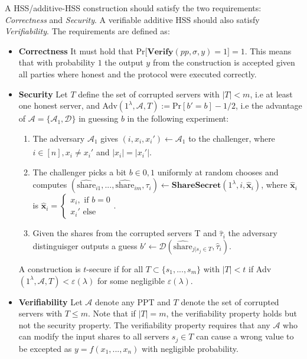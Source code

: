 A HSS/additive-HSS construction should satisfy the two requirements: \textit{Correctness} and \textit{Security}. A verifiable additive HSS should also satisfy \textit{Verifiability}. The requirements are defined as:
\begin{itemize}
    \item \textbf{Correctness} It must hold that Pr$\Big[\textbf{Verify}(pp,\sigma,y)=1\Big]=1$. This means that with probability $1$ the output $y$ from the construction is accepted given all parties where honest and the protocol were executed correctly.
    \item \textbf{Security} Let $T$ define the set of corrupted servers with $|T|<m$, i.e at least one honest server, and Adv$(1^\lambda,\mathcal{A},T):= \text{Pr}[b' = b]-1/2$, i.e the advantage of $\mathcal{A}=\{\mathcal{A}_1,\mathcal{D}\}$ in guessing $b$ in the following experiment:
    \begin{enumerate}
        \item The adversary $\mathcal{A}_1$ gives $(i,x_i,x_i')\xleftarrow[]{}\mathcal{A}_1$ to the challenger, where $i\in[n], x_i\neq x_i'$ and $|x_i|=|x_i'|$.
        \item The challenger picks a bit $b\in{0,1}$ uniformly at random chooses and computes $(\hat{\text{share}}_{i1},...,\hat{\text{share}}_{im},\tau_i)\xleftarrow[]{}\textbf{ShareSecret}(1^\lambda,i,\hat{\mathbf{x}}_i)$, where $\hat{\textbf{x}}_i$ is $\hat{\textbf{x}}_i = \begin{cases}x_i, \text{ if } b=0 \\ x_i' \text{ else} \end{cases}$. 
        \item Given the shares from the corrupted servers T and $\hat{\tau}_i$ the adversary distinguisger outputs a guess $b'\xleftarrow[]{}\mathcal{D}(\hat{\text{share}}_{j|s_j\in T},\hat{\tau}_i)$.
    \end{enumerate}
    A construction is $t$-secure if for all $T\subset \{s_1,...,s_m\}$ with $|T|<t$ if Adv$(1^\lambda,\mathcal{A},T)<\varepsilon(\lambda)$ for some negligible $\varepsilon(\lambda)$.
    \item \textbf{Verifiability} Let $\mathcal{A}$ denote any PPT and $T$ denote the set of corrupted servers with $T\leq m$. Note that if $|T|=m$, the verifiability property holds but not the security property. The verifiability property requires that any $\mathcal{A}$ who can modify the input shares to all servers $s_j\in T$ can cause a wrong value to be excepted as $y=f(x_1,...,x_n)$ with negligible probability.   
\end{itemize}



